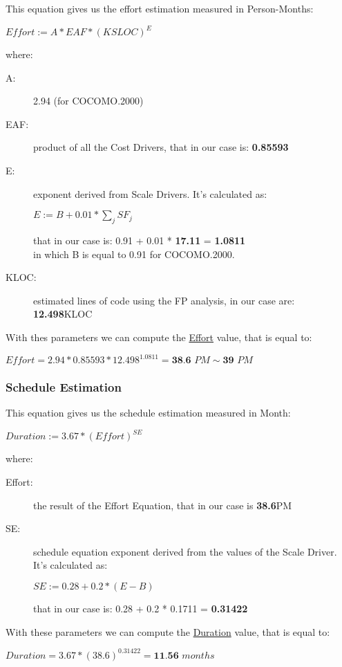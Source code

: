 This equation gives us the effort estimation measured in Person-Months:
\begin{center}
	$ Effort := A * EAF * (KSLOC)^{E} $
\end{center}
where:
\begin{description}
	\item [A:] {2.94 (for COCOMO.2000) }
	\item [EAF:] {product of all the Cost Drivers, that in our case is: \textbf{0.85593}} 
	\item [E:] {exponent derived from Scale Drivers. It's calculated as:
		\begin{center}
			$ E := B + 0.01 * \sum_{j} SF_{j} $
		\end{center}
		that in our case is: 0.91 + 0.01 * \textbf{17.11} = \textbf{1.0811}\\ in which B is equal to 0.91 for COCOMO.2000.}
	\item [KLOC:] {estimated lines of code using the FP analysis, in our case are: \textbf{12.498}KLOC}
\end{description}
With thes parameters we can compute the \underline{Effort} value, that is equal to:
\begin{center}
	$ Effort = 2.94 * 0.85593 * 12.498^{1.0811} = \textbf{38.6 } PM \sim \textbf{39 } PM $
\end{center}

\vfill
\subsubsection{Schedule Estimation}

This equation gives us the schedule estimation measured in Month:
\begin{center}
	$ Duration := 3.67 * (Effort)^{SE}$ 
\end{center}
where: 
\begin{description}
	\item [Effort:] {the result of the Effort Equation, that in our case is \textbf{38.6}PM }
	\item [SE:] {schedule equation exponent derived from the values of the Scale Driver. It's calculated as:
		\begin{center}
			$ SE := 0.28 + 0.2 * (E - B) $
		\end{center}
	that in our case is: 0.28 + 0.2 * 0.1711 = \textbf{0.31422} }
\end{description}
With these parameters we can compute the \underline{Duration} value, that is equal to:
\begin{center}
	$ Duration = 3.67 * (38.6)^{0.31422} = \textbf{11.56 } months $ \\
\end{center}